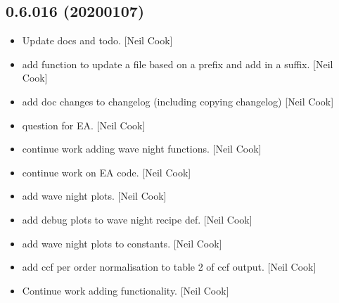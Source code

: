\documentclass[a4paper,10pt,english]{report}
\begin{document}
\subsection{0.6.016 (2020\sphinxhyphen{}01\sphinxhyphen{}07)}
\label{\detokenize{misc/changelog:id21}}\begin{itemize}
\item {} 
Update docs \sphinxhyphen{}  and todo. {[}Neil Cook{]}

\item {} 
 \sphinxhyphen{} add function to update a
file based on a prefix and add in a suffix. {[}Neil Cook{]}

\item {} 
 \sphinxhyphen{} add doc changes to changelog
(including copying changelog) {[}Neil Cook{]}

\item {} 
 \sphinxhyphen{} question for EA. {[}Neil Cook{]}

\item {} 
 \sphinxhyphen{} continue work adding wave night functions.
{[}Neil Cook{]}

\item {} 
 \sphinxhyphen{} continue work on EA code.
{[}Neil Cook{]}

\item {} 
 \sphinxhyphen{} add wave night plots. {[}Neil Cook{]}

\item {} 
 \sphinxhyphen{} add debug plots to
wave night recipe def. {[}Neil Cook{]}

\item {} 
 \sphinxhyphen{} add wave night plots to
constants. {[}Neil Cook{]}

\item {} 
 \sphinxhyphen{} add ccf per order normalisation to table
2 of ccf output. {[}Neil Cook{]}

\item {} 
Continue work adding  functionality. {[}Neil Cook{]}


\end{itemize}
\end{document}
